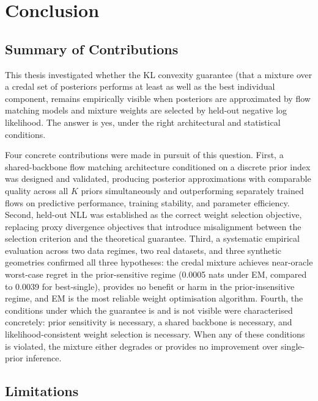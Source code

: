 \chapter{Conclusion}
\label{chap:conclusion}

\section{Summary of Contributions}

This thesis investigated whether the KL 
convexity guarantee (that a mixture over 
a credal set of posteriors performs at 
least as well as the best individual 
component, remains empirically visible 
when posteriors are approximated by 
flow matching models and mixture weights 
are selected by held-out negative log 
likelihood. The answer is yes, under 
the right architectural and statistical 
conditions.

Four concrete contributions were made 
in pursuit of this question. First, a 
shared-backbone flow matching architecture 
conditioned on a discrete prior index 
was designed and validated, producing 
posterior approximations with comparable 
quality across all $K$ priors 
simultaneously and outperforming 
separately trained flows on predictive 
performance, training stability, and 
parameter efficiency. Second, held-out 
NLL was established as the correct 
weight selection objective, replacing 
proxy divergence objectives that 
introduce misalignment between the 
selection criterion and the theoretical 
guarantee. Third, a systematic empirical 
evaluation across two data regimes, two 
real datasets, and three synthetic 
geometries confirmed all three 
hypotheses: the credal mixture achieves 
near-oracle worst-case regret in the 
prior-sensitive regime (0.0005 nats 
under EM, compared to 0.0039 for 
best-single), provides no benefit or 
harm in the prior-insensitive regime, 
and EM is the most reliable weight 
optimisation algorithm. Fourth, the 
conditions under which the guarantee 
is and is not visible were characterised 
concretely: prior sensitivity is 
necessary, a shared backbone is 
necessary, and likelihood-consistent 
weight selection is necessary. When 
any of these conditions is violated, 
the mixture either degrades or provides 
no improvement over single-prior 
inference.

\section{Limitations}

